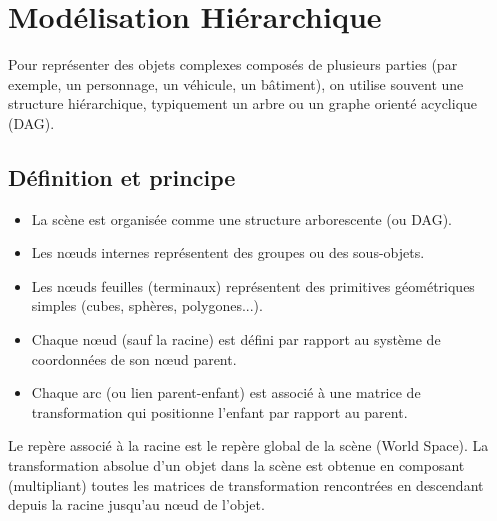 \section{Modélisation Hiérarchique}
Pour représenter des objets complexes composés de plusieurs parties (par exemple, un personnage, un véhicule, un bâtiment), on utilise souvent une structure hiérarchique, typiquement un arbre ou un graphe orienté acyclique (DAG).
\subsection{Définition et principe}
\begin{itemize}
    \item La scène est organisée comme une structure arborescente (ou DAG).
    \item Les nœuds internes représentent des groupes ou des sous-objets.
    \item Les nœuds feuilles (terminaux) représentent des primitives géométriques simples (cubes, sphères, polygones...).
    \item Chaque nœud (sauf la racine) est défini par rapport au système de coordonnées de son nœud parent.
    \item Chaque arc (ou lien parent-enfant) est associé à une matrice de transformation qui positionne l'enfant par rapport au parent.
\end{itemize}
Le repère associé à la racine est le repère global de la scène (World Space). La transformation absolue d'un objet dans la scène est obtenue en composant (multipliant) toutes les matrices de transformation rencontrées en descendant depuis la racine jusqu'au nœud de l'objet.
